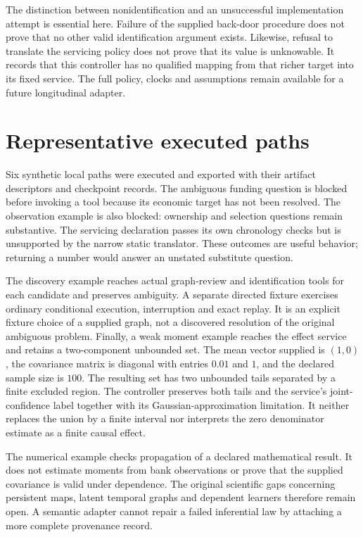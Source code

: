 The distinction between nonidentification and an unsuccessful implementation
attempt is essential here. Failure of the supplied back-door procedure does
not prove that no other valid identification argument exists. Likewise, refusal
to translate the servicing policy does not prove that its value is unknowable.
It records that this controller has no qualified mapping from that richer
target into its fixed service. The full policy, clocks and assumptions remain
available for a future longitudinal adapter.

\section{Representative executed paths}

Six synthetic local paths were executed and exported with their artifact
descriptors and checkpoint records. The ambiguous funding question is blocked
before invoking a tool because its economic target has not been resolved. The
observation example is also blocked: ownership and selection questions remain
substantive. The servicing declaration passes its own chronology checks but is
unsupported by the narrow static translator. These outcomes are useful behavior;
returning a number would answer an unstated substitute question.

The discovery example reaches actual graph-review and identification tools for
each candidate and preserves ambiguity. A separate directed fixture exercises
ordinary conditional execution, interruption and exact replay. It is an explicit
fixture choice of a supplied graph, not a discovered resolution of the original
ambiguous problem. Finally, a weak moment example reaches the effect service
and retains a two-component unbounded set. The mean vector supplied is $(1,0)$,
the covariance matrix is diagonal with entries $0.01$ and $1$, and the declared
sample size is $100$. The resulting set has two unbounded tails separated by a
finite excluded region. The controller preserves both tails and the service's
joint-confidence label together with its Gaussian-approximation limitation.
It neither replaces the union by a finite interval nor interprets the zero
denominator estimate as a finite causal effect.

The numerical example checks propagation of a declared mathematical result.
It does not estimate moments from bank observations or prove that the supplied
covariance is valid under dependence. The original scientific gaps concerning
persistent maps, latent temporal graphs and dependent learners therefore remain
open. A semantic adapter cannot repair a failed inferential law by attaching a
more complete provenance record.

